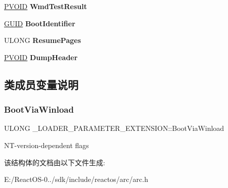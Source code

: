 \begin{DoxyCompactItemize}
\item 
\mbox{\label{struct___l_o_a_d_e_r___p_a_r_a_m_e_t_e_r___e_x_t_e_n_s_i_o_n_acc91a59006d047a7ec30df346f3236fc}} 
\hyperlink{interfacevoid}{P\+V\+O\+ID} {\bfseries Wmd\+Test\+Result}
\item 
\mbox{\label{struct___l_o_a_d_e_r___p_a_r_a_m_e_t_e_r___e_x_t_e_n_s_i_o_n_aea4adc7a8b6abe87b783866f68496089}} 
\hyperlink{interface_g_u_i_d}{G\+U\+ID} {\bfseries Boot\+Identifier}
\item 
\mbox{\label{struct___l_o_a_d_e_r___p_a_r_a_m_e_t_e_r___e_x_t_e_n_s_i_o_n_ac0e2486ba3cea1706d04b698af1a0375}} 
U\+L\+O\+NG {\bfseries Resume\+Pages}
\item 
\mbox{\label{struct___l_o_a_d_e_r___p_a_r_a_m_e_t_e_r___e_x_t_e_n_s_i_o_n_aac1832788bc39b5646689c59efe0d971}} 
\hyperlink{interfacevoid}{P\+V\+O\+ID} {\bfseries Dump\+Header}
\end{DoxyCompactItemize}


\subsection{类成员变量说明}
\mbox{\label{struct___l_o_a_d_e_r___p_a_r_a_m_e_t_e_r___e_x_t_e_n_s_i_o_n_a3bb7b7c1db4a93520de8ee233ea97fe5}} 
\subsubsection{\texorpdfstring{Boot\+Via\+Winload}{BootViaWinload}}
{\footnotesize\ttfamily U\+L\+O\+NG \+\_\+\+L\+O\+A\+D\+E\+R\+\_\+\+P\+A\+R\+A\+M\+E\+T\+E\+R\+\_\+\+E\+X\+T\+E\+N\+S\+I\+O\+N\+::\+Boot\+Via\+Winload}

N\+T-\/version-\/dependent flags 

该结构体的文档由以下文件生成\+:\begin{DoxyCompactItemize}
\item 
E\+:/\+React\+O\+S-\/0../sdk/include/reactos/arc/arc.\+h\end{DoxyCompactItemize}
